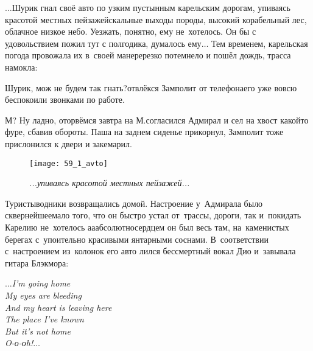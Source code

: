 
$\ldots$Шурик гнал своё авто по узким пустынным карельским дорогам, упиваясь красотой местных пейзажей\mdash скальные выходы породы, высокий корабельный лес, облачное низкое небо. Уезжать, понятно, ему не~хотелось. Он бы с удовольствием пожил тут с полгодика, думалось ему$\ldots$ Тем временем, карельская погода провожала их в~своей манере\mdash резко потемнело и пошёл дождь, трасса намокла:

{
\diagdash Шурик, мож не будем так гнать?\mdash отвлёкся Замполит от телефона\mdash его уже вовсю беспокоили звонками по работе.

\diagdash М? Ну ладно, оторвёмся завтра на М.\mdash согласился Адмирал и сел на хвост какой\sdash то фуре, сбавив обороты. Паша на заднем сиденье прикорнул, Замполит тоже прислонился к двери и закемарил.
}

\newpage

\begin{figure}[h]
	\centering
	\texttt{[image: 59\_1\_avto]}
	\caption{\small\textit{...упиваясь красотой местных пейзажей...}}
\end{figure}
Туристы\sdash водники возвращались домой. Настроение у~Адмирала было сквернейшее\mdash мало того, что он быстро устал от~трассы, дороги, так и~покидать Карелию не~хотелось а\sdash а\sdash абсолютно\mdash сердцем он был весь там, на~каменистых берегах с~упоительно красивыми янтарными соснами. В~соответствии с~настроением из~колонок его авто лился бессмертный вокал Дио и~завывала гитара Блэкмора:

\vspace{0.3cm}
\noindent\textit{%
	\hspace*{3.4cm}$\ldots$I'm going home\\
	\hspace*{3.4cm}My eyes are bleeding\\
	\hspace*{3.4cm}And my heart is leaving here\\
	\hspace*{3.4cm}The place I've known\\
	\hspace*{3.4cm}But it's not home\\
	\hspace*{3.4cm}O-о-оh!$\ldots$\\
}
\vspace{0.3cm} 

